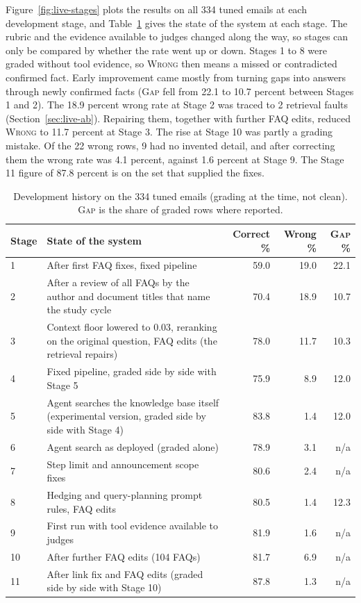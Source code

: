 Figure~\ref{fig:live-stages} plots the results on all 334 tuned emails at each development stage, and Table~\ref{tab:live-history} gives the state of the system at each stage. The rubric and the evidence available to judges changed along the way, so stages can only be compared by whether the rate went up or down. Stages 1 to 8 were graded without tool evidence, so \textsc{Wrong} then means a missed or contradicted confirmed fact. Early improvement came mostly from turning gaps into answers through newly confirmed facts (\textsc{Gap} fell from 22.1 to 10.7 percent between Stages 1 and 2). The 18.9 percent wrong rate at Stage 2 was traced to 2 retrieval faults (Section~\ref{sec:live-ab}). Repairing them, together with further FAQ edits, reduced \textsc{Wrong} to 11.7 percent at Stage 3. The rise at Stage 10 was partly a grading mistake. Of the 22 wrong rows, 9 had no invented detail, and after correcting them the wrong rate was 4.1 percent, against 1.6 percent at Stage 9. The Stage 11 figure of 87.8 percent is on the set that supplied the fixes.

\begin{table}[htbp]
\centering
\caption[Development history on the 334 tuned emails (grading at the time, not clean)]{Development history on the 334 tuned emails (grading at the time, not clean). \textsc{Gap} is the share of graded rows where reported.}
\label{tab:live-history}
\small
\begin{tabularx}{\linewidth}{@{}l>{\raggedright\arraybackslash}Xrrr@{}}
\toprule
Stage & State of the system & Correct \% & Wrong \% & \textsc{Gap} \% \\
\midrule
1 & After first FAQ fixes, fixed pipeline & 59.0 & 19.0 & 22.1 \\
2 & After a review of all FAQs by the author and document titles that name the study cycle & 70.4 & 18.9 & 10.7 \\
3 & Context floor lowered to 0.03, reranking on the original question, FAQ edits (the retrieval repairs) & 78.0 & 11.7 & 10.3 \\
4 & Fixed pipeline, graded side by side with Stage 5 & 75.9 & 8.9 & 12.0 \\
5 & Agent searches the knowledge base itself (experimental version, graded side by side with Stage 4) & 83.8 & 1.4 & 12.0 \\
6 & Agent search as deployed (graded alone) & 78.9 & 3.1 & n/a \\
7 & Step limit and announcement scope fixes & 80.6 & 2.4 & n/a \\
8 & Hedging and query-planning prompt rules, FAQ edits & 80.5 & 1.4 & 12.3 \\
9 & First run with tool evidence available to judges & 81.9 & 1.6 & n/a \\
10 & After further FAQ edits (104 FAQs) & 81.7 & 6.9 & n/a \\
11 & After link fix and FAQ edits (graded side by side with Stage 10) & 87.8 & 1.3 & n/a \\
\bottomrule
\end{tabularx}
\end{table}


